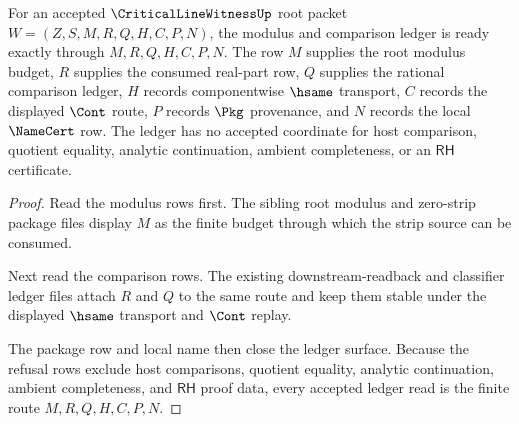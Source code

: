 \begin{theorem}
\label{thm:critical-line-witness-root-ledger-readiness}
For an accepted $\CriticalLineWitnessUp$ root packet
$W=(Z,S,M,R,Q,H,C,P,N)$, the modulus and comparison ledger is ready exactly
through $M,R,Q,H,C,P,N$. The row $M$ supplies the root modulus budget, $R$
supplies the consumed real-part row, $Q$ supplies the rational comparison
ledger, $H$ records componentwise $\hsame$ transport, $C$ records the
displayed $\Cont$ route, $P$ records $\Pkg$ provenance, and $N$ records the
local $\NameCert$ row. The ledger has no accepted coordinate for host
comparison, quotient equality, analytic continuation, ambient completeness, or
an $\mathsf{RH}$ certificate.
\end{theorem}
\begin{proof}
Read the modulus rows first. The sibling root modulus and zero-strip package
files display $M$ as the finite budget through which the strip source can be
consumed.

Next read the comparison rows. The existing downstream-readback and classifier
ledger files attach $R$ and $Q$ to the same route and keep them stable under
the displayed $\hsame$ transport and $\Cont$ replay.

The package row and local name then close the ledger surface. Because the
refusal rows exclude host comparisons, quotient equality, analytic
continuation, ambient completeness, and $\mathsf{RH}$ proof data, every
accepted ledger read is the finite route $M,R,Q,H,C,P,N$.
\end{proof}

